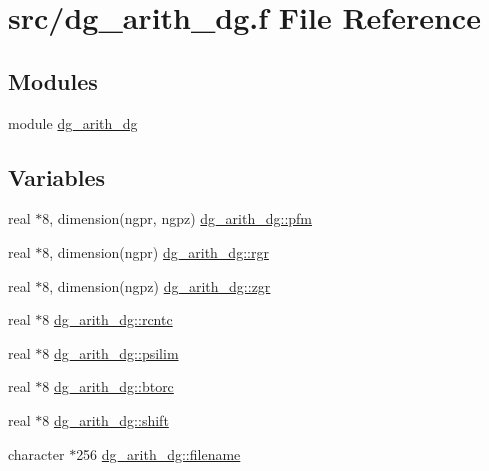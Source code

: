\hypertarget{dg__arith__dg_8f}{
\section{src/dg\_\-arith\_\-dg.f File Reference}
\label{dg__arith__dg_8f}
}
\subsection*{Modules}
\begin{CompactItemize}
\item 
module \hyperlink{namespacedg__arith__dg}{dg\_\-arith\_\-dg}
\end{CompactItemize}
\subsection*{Variables}
\begin{CompactItemize}
\item 
real $\ast$8, dimension(ngpr, ngpz) \hyperlink{namespacedg__arith__dg_1b7f6dcfe1f48dfc989814a1519c6719}{dg\_\-arith\_\-dg::pfm}
\item 
real $\ast$8, dimension(ngpr) \hyperlink{namespacedg__arith__dg_102091a4aff5243e0e79f2a5e5cfffe2}{dg\_\-arith\_\-dg::rgr}
\item 
real $\ast$8, dimension(ngpz) \hyperlink{namespacedg__arith__dg_8a5f886abc8b62b69d48cfd735cfd10b}{dg\_\-arith\_\-dg::zgr}
\item 
real $\ast$8 \hyperlink{namespacedg__arith__dg_3dc865564702fd81046c19f0a8f35140}{dg\_\-arith\_\-dg::rcntc}
\item 
real $\ast$8 \hyperlink{namespacedg__arith__dg_456997baf11ae7fdf46a2643ced4568f}{dg\_\-arith\_\-dg::psilim}
\item 
real $\ast$8 \hyperlink{namespacedg__arith__dg_7a992e5a439388ce2c9624a01757a066}{dg\_\-arith\_\-dg::btorc}
\item 
real $\ast$8 \hyperlink{namespacedg__arith__dg_e54e3bfed258b16e900ebe885e898537}{dg\_\-arith\_\-dg::shift}
\item 
character $\ast$256 \hyperlink{namespacedg__arith__dg_e5e4ec783b359df8e12cc4bda2a44ea1}{dg\_\-arith\_\-dg::filename}
\end{CompactItemize}
